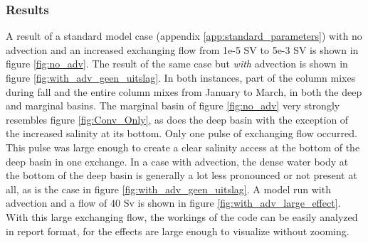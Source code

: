 \documentclass[twocolumn]{article}
\begin{document}
\subsubsection{Results}
A result of a standard model case (appendix \ref{app:standard_parameters}) with no advection and an increased exchanging flow from 1e-5 SV to 5e-3 SV is shown in figure \ref{fig:no_adv}. The result of the same case but \textit{with} advection is shown in figure \ref{fig:with_adv_geen_uitslag}. In both instances, part of the column mixes during fall and the entire column mixes from January to March, in both the deep and marginal basins. The marginal basin of figure \ref{fig:no_adv} very strongly resembles figure \ref{fig:Conv_Only}, as does the deep basin with the exception of the increased salinity at its bottom. Only one pulse of exchanging flow occurred. This pulse was large enough to create a clear salinity access at the bottom of the deep basin in one exchange.
In a case with advection, the dense water body at the bottom of the deep basin is generally a lot less pronounced or not present at all, as is the case in figure \ref{fig:with_adv_geen_uitslag}. A model run with advection and a flow of 40 Sv is shown in figure \ref{fig:with_adv_large_effect}. With this large exchanging flow, the workings of the code can be easily analyzed in report format, for the effects are large enough to visualize without zooming.%


\end{document}
